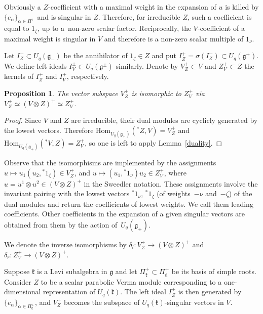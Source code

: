 \documentclass[pdftex]{sigma}
\numberwithin{equation}{section}
\newtheorem{Proposition}[Theorem]{Proposition}
 { \theoremstyle{definition}
\newtheorem{Definition}[Theorem]{Definition}
\newtheorem{Example}[Theorem]{Example}
\newtheorem{Remark}[Theorem]{Remark} }
\begin{document}
Obviously a $Z$-coefficient with a maximal weight in the expansion of $u$ is killed by $\{e_\alpha\}_{\alpha \in \Pi^+}$ and is singular in $Z$. Therefore, for irreducible $Z$, such a coefficient is equal to $1_\zeta$, up to a~non-zero scalar factor. Reciprocally, the $V$-coefficient of a maximal weight is singular in $V$ and therefore is a non-zero scalar multiple of $1_\nu$.

Let $I^-_Z\subset U_q(\mathfrak{g}_-)$ be the annihilator of $1_\zeta\in Z$ and put $I^+_Z=\sigma(I^-_Z)\subset U_q(\mathfrak{g}^+)$. We define left ideals $I^\pm_V \subset U_q(\mathfrak{g}^\pm)$ similarly. Denote by $V^+_Z\subset V$ and $Z^+_V\subset Z$ the kernels of $I^+_Z$ and $I^+_V$, respectively.
\begin{Proposition}\label{V-Z-extr}The vector subspace $V^+_Z$ is isomorphic to $Z^+_V$ via $V^+_Z\simeq (V\otimes Z)^+\simeq Z^+_V$.
\end{Proposition}
\begin{proof}Since $V$ and $Z$ are irreducible, their dual modules are cyclicly generated by the lowest vectors. Therefore $\mathrm{Hom}_{U_q(\mathfrak{g}_+)}({}^*\!Z,V)=V^+_Z$ and $\mathrm{Hom}_{U_q(\mathfrak{g}_+)}({}^*\!V,Z)=Z^+_V$, so one is left to apply Lemma~\ref{duality}.
\end{proof}

Observe that the isomorphisms are implemented by the assignments $u\mapsto u_1 (u_2, {}^*\!1_{\zeta})\in V^+_Z$, and $u\mapsto ( u_1, {}^*\!1_{\nu}) u_2 \in Z^+_V$, where $u=u^1\otimes u^2\in (V\otimes Z)^+$ in the Sweedler notation. These assignments involve the invariant pairing with the lowest vectors ${}^*\!1_{\nu}$, ${}^*\!1_{\zeta}$ (of weights~$-\nu$ and~$-\zeta$) of the dual modules and return the coefficients of lowest weights. We call them leading coefficients. Other coefficients in the expansion of a given singular vectors are obtained from them by the action of~$U_q(\mathfrak{g}_+)$.

We denote the inverse isomorphisms by $\delta_l \colon V^+_Z\to (V\otimes Z)^+$ and $\delta_r\colon Z^+_V\to (V\otimes Z)^+$.

\begin{Example}Suppose $\mathfrak{k}$ is a Levi subalgebra in $\mathfrak{g}$ and let $\Pi^+_\mathfrak{k}\subset \Pi^+_\mathfrak{g}$ be its basis of simple roots. Consider $Z$ to be a scalar parabolic Verma module corresponding to a one-dimensional representation of $U_q(\mathfrak{k})$. The left ideal $I^+_Z$ is then generated by $\{e_\alpha\}_{\alpha\in \Pi^+_\mathfrak{k}}$, and $V^+_Z$ becomes the subspace of $U_q(\mathfrak{k})$-singular vectors in $V$.
\end{Example}
\end{document}
